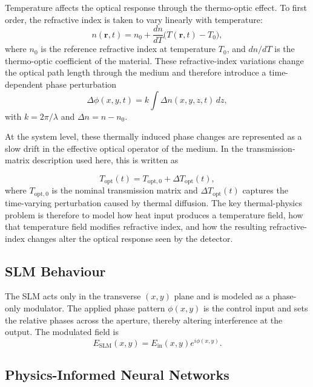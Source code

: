 \documentclass[11pt,letterpaper]{article}
\begin{document}
Temperature affects the optical response through the thermo-optic effect. To first order, the
refractive index is taken to vary linearly with temperature:
\begin{equation}
n(\mathbf{r},t)=n_0+\frac{dn}{dT}\bigl(T(\mathbf{r},t)-T_0\bigr),
\end{equation}
where \(n_0\) is the reference refractive index at temperature \(T_0\), and \(dn/dT\) is the
thermo-optic coefficient of the material. These refractive-index variations change the optical path
length through the medium and therefore introduce a time-dependent phase perturbation
\begin{equation}
\Delta \phi(x,y,t)=k\int \Delta n(x,y,z,t)\,dz,
\end{equation}
with \(k=2\pi/\lambda\) and \(\Delta n = n-n_0\).

At the system level, these thermally induced phase changes are represented as a slow drift in the
effective optical operator of the medium. In the transmission-matrix description used here, this is
written as

\begin{equation}
T_{\mathrm{opt}}(t)=T_{\mathrm{opt},0}+\Delta T_{\mathrm{opt}}(t),
\end{equation}
where \(T_{\mathrm{opt},0}\) is the nominal transmission matrix and \(\Delta T_{\mathrm{opt}}(t)\) captures the
time-varying perturbation caused by thermal diffusion. The key thermal-physics problem is therefore
to model how heat input produces a temperature field, how that temperature field modifies refractive
index, and how the resulting refractive-index changes alter the optical response seen by the detector.

\subsection{SLM Behaviour}

The SLM acts only in the transverse $(x,y)$ plane and is modeled as a phase-only modulator. The
applied phase pattern $\phi(x,y)$ is the control input and sets the relative phases across the
aperture, thereby altering interference at the output. The modulated field is
\[
E_{\mathrm{SLM}}(x,y)=E_{\mathrm{in}}(x,y)e^{i\phi(x,y)}.
\]

\newpage

\subsection{Physics-Informed Neural Networks}
\end{document}
